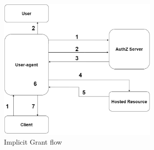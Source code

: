 \documentclass[a4paper,12pt]{article}
\begin{document}
\begin{figure}[htbp]
    \centering
    \includegraphics[width=0.7\textwidth]{figures/implicit_flow_general.png}
    \caption{Implicit Grant flow}
    \label{fig:flowa}
\end{figure}
\end{document}
